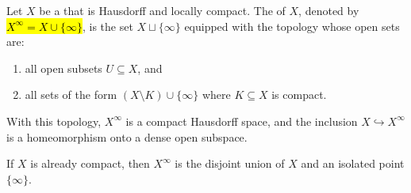 \begin{definition} \label{definition:one_point_compactification_of_a_topological_space}
    Let $X$ be a  that is Hausdorff and locally compact. The  of $X$, denoted by \hl{$X^\infty = X \cup \{\infty\}$}, is the set $X \sqcup \{\infty\}$ equipped with the topology whose open sets are:
    \begin{enumerate}
        \item all open subsets $U \subseteq X$, and
        \item all sets of the form $(X \setminus K) \cup \{\infty\}$ where $K \subseteq X$ is compact.
    \end{enumerate}
    With this topology, $X^\infty$ is a compact Hausdorff space, and the inclusion $X \hookrightarrow X^\infty$ is a homeomorphism onto a dense open subspace.

    If $X$ is already compact, then $X^\infty$ is the disjoint union of $X$ and an isolated point $\{\infty\}$.
\end{definition}
